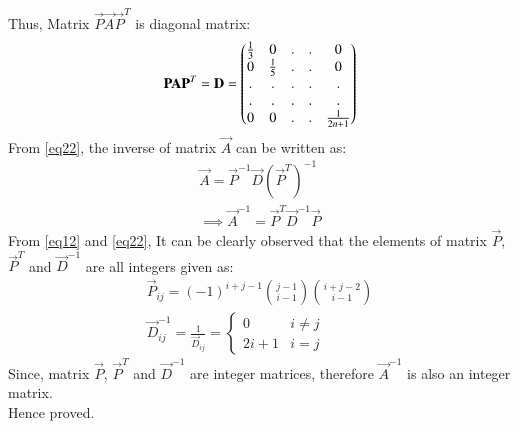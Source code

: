 \documentclass[journal,12pt,twocolumn]{IEEEtran}
\begin{document}
Thus, Matrix $\vec{P}\vec{A}\vec{P}^T$ is diagonal matrix:
\begin{align}
    \mathbf{P}\mathbf{A}\mathbf{P}^T=\mathbf{D}=\begin{pmatrix}\frac{1}{3} & 0 &.&.&0\\
    0 & \frac{1}{5} &.&.&0\\
    .&.&.&.&.\\.&.&.&.&.\\0 &0 &.&.&\frac{1}{2n+1}\end{pmatrix} \label{eq22}
\end{align}
From \eqref{eq22}, the inverse of matrix $\vec{A}$ can be written as:
\begin{align}
    \vec{A}=\vec{P}^{-1}\vec{D}(\vec{P}^T)^{-1}\\
    \implies \vec{A}^{-1}=\vec{P}^T\vec{D}^{-1}\vec{P}
\end{align}
From \eqref{eq12} and \eqref{eq22}, It can be clearly observed that the elements of matrix $\vec{P}$, $\vec{P}^T$ and $\vec{D}^{-1}$ are all integers given as:
\begin{align}
    \vec{P}_{ij}=(-1)^{i+j-1} {j-1 \choose i-1} {i+j-2 \choose i-1} \\
    \vec{D}^{-1}_{ij}=\frac{1}{\vec{D}_{ij}}=   \left\{\begin{matrix}
    0 & i\neq j\\ 
    2i+1 & i=j
    \end{matrix}\right.
\end{align}
Since, matrix $\vec{P}$, $\vec{P}^T$ and $\vec{D}^{-1}$ are integer matrices, therefore $\vec{A}^{-1}$ is also an integer matrix.\\
Hence proved.\\
\end{document}
